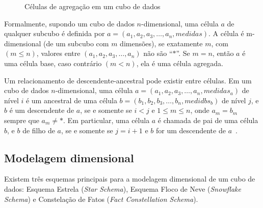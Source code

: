 \begin{figure}[!htb]
  \caption{Células de agregação em um cubo de dados}\label{fig:hasse}
	\vspace{2mm}
	\begin{center}
	\end{center}
	\vspace{1mm}
	\legenda{}
\end{figure}

Formalmente, supondo um cubo de dados $n$-dimensional, uma célula $a$ de qualquer subcubo é definida por $a = (a_1, a_2, a_3, \ldots, a_n, medidas)$.
A célula é m-dimensional (de um subcubo com $m$ dimensões), se exatamente $m$, com $(m \leq n)$, valores entre $(a_1, a_2, a_3, \ldots, a_n)$ não são ``$*$''.
Se $m = n$, então $a$ é uma célula base, caso contrário $(m < n)$, ela é uma célula agregada.

Um relacionamento de descendente-ancestral pode existir entre células.
Em um cubo de dados $n$-dimensional, uma célula $a = (a_1, a_2, a_3, \ldots, a_n, medidas_a)$ de nível $i$ é um ancestral de uma célula $b = (b_1, b_2, b_3, \ldots, b_n, medidbs_b)$ de nível $j$, e $b$ é um descendente de $a$, se e somente se $i < j$ e $1 \leq m \leq n$, onde $a_m = b_m$ sempre que $a_m \neq *$.
Em particular, uma célula $a$ é chamada de pai de uma célula $b$, e $b$ de filho de $a$, se e somente se $j = i+1$ e $b$ for um descendente de $a$~\cite{hanDataMiningConcepts2011}.

\subsection{Modelagem dimensional}\label{ch:fun:cube:dimm}

Existem três esquemas principais para a modelagem dimensional de um cubo de dados: Esquema Estrela (\textit{Star Schema}), Esquema Floco de Neve (\textit{Snowflake Schema}) e Constelação de Fatos (\textit{Fact Constellation Schema}).

